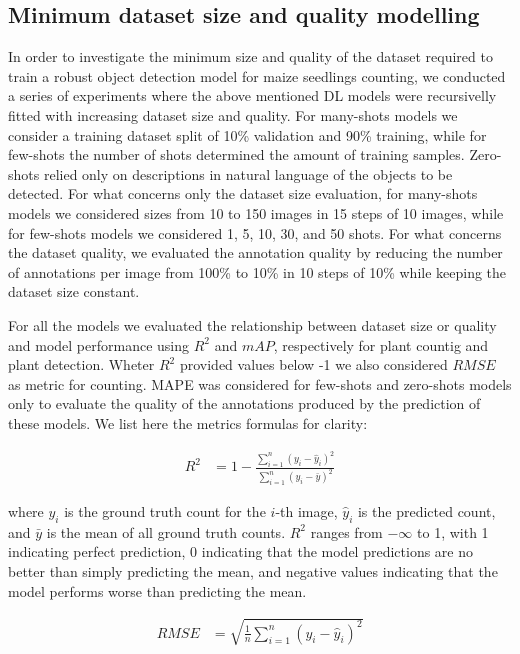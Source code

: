 \documentclass[journal,article,submit,pdftex,moreauthors]{Definitions/mdpi}
\begin{document}
\subsection{Minimum dataset size and quality modelling}
In order to investigate the minimum size and quality of the dataset required to train 
a robust object detection model for maize seedlings counting, we conducted a series of experiments
where the above mentioned DL models were recursivelly fitted with increasing dataset size and quality.
For many-shots models we consider a training 
dataset split of 10\% validation and 90\% training, while for few-shots the number of shots
determined the amount of training samples. Zero-shots relied only on descriptions 
in natural language of the objects to be detected.
For what concerns only the dataset size evaluation, for many-shots models we considered
sizes from 10 to 150 images in 15 steps of 10 images, while for few-shots models we considered
1, 5, 10, 30, and 50 shots.
For what concerns the dataset quality, we evaluated the annotation quality by reducing
the number of annotations per image from 100\% to 10\% in 10 steps of 10\% while
keeping the dataset size constant.

For all the models we evaluated the relationship between dataset size or quality and model performance
using $R^2$ and $mAP$, respectively for plant countig and plant detection. Wheter 
$R^2$ provided values below -1 we also considered $RMSE$ as metric for counting.
MAPE was considered for few-shots and zero-shots models only to evaluate the 
quality of the annotations produced by the prediction of these models.
We list here the metrics formulas for clarity:

\begin{align}
R^2 &= 1 - \frac{\sum_{i=1}^{n} (y_i - \hat{y}_i)^2}{\sum_{i=1}^{n} (y_i - \bar{y})^2}
\end{align}

where $y_i$ is the ground truth count for the $i$-th image, $\hat{y}_i$ is the 
predicted count, and $\bar{y}$ is the mean of all ground truth counts. $R^2$ ranges 
from $-\infty$ to 1, with 1 indicating perfect prediction, 0 indicating that the 
model predictions are no better than simply predicting the mean, and negative 
values indicating that the model performs worse than predicting the mean.

\begin{align}
\text{$RMSE$} &= \sqrt{\frac{1}{n}\sum_{i=1}^{n} (y_i - \hat{y}_i)^2}
\end{align}
\end{document}
